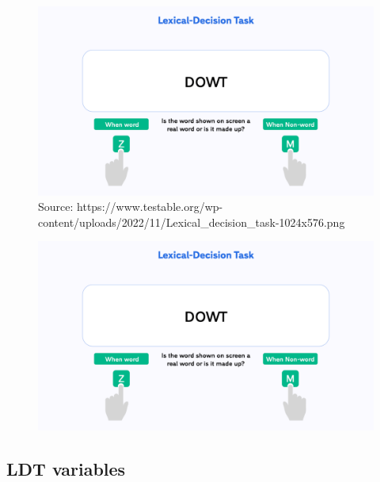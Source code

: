 \documentclass[
  letterpaper,
  DIV=11]{scrartcl}
\theoremstyle{definition}
\theoremstyle{remark}
\begin{document}
\begin{figure}

{\centering \includegraphics[width=1\textwidth,height=\textheight]{_intro_r_slides_files/figure-pdf/unnamed-chunk-7-1.png}

}

\caption{Source:
https://www.testable.org/wp-content/uploads/2022/11/Lexical\_decision\_task-1024x576.png}

\end{figure}

\begin{figure}

{\centering \includegraphics[width=1\textwidth,height=\textheight]{_intro_r_slides_files/figure-pdf/unnamed-chunk-8-1.png}

}

\end{figure}

\hypertarget{ldt-variables}{%
\subsection{LDT variables}\label{ldt-variables}}
\end{document}
